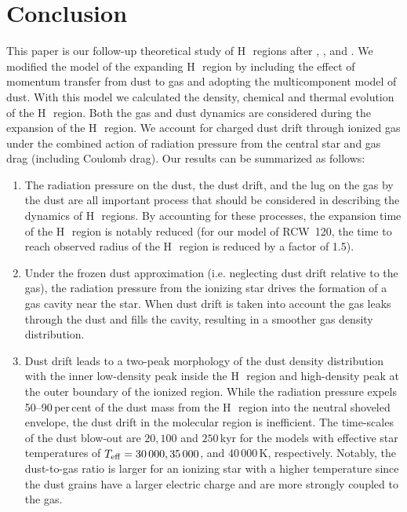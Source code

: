 \documentclass[a4paper,fleqn,usenatbib]{mnras}
\newcommand{\hii}    {H\,{\sc{ii}}~}
\begin{document}
\section{Conclusion}
This paper is our follow-up theoretical study of \hii regions after \cite{paper_hiimodel}, \cite{PavlyuchenkovAR}, and \cite{paper_mnrasi}. We modified the model of the expanding \hii region by including the effect of momentum transfer from dust to gas and adopting the multicomponent model of dust. With this model we calculated the density, chemical and thermal evolution of the \hii region. Both the gas and dust dynamics are considered during the expansion of the \hii region. We account for charged dust drift through ionized gas under the combined action of radiation pressure from the central star and gas drag (including Coulomb drag). Our results can be summarized as follows:
\begin{enumerate}
\item The radiation pressure on the dust, the dust drift, and the lug on the gas by the dust are all important process that should be considered in describing the dynamics of \hii regions. By accounting for these processes, the expansion time of the \hii region is notably reduced (for our model of RCW~120, the time to reach observed radius of the \hii region is reduced by a factor of 1.5).

\item Under the frozen dust approximation (i.e. neglecting dust drift relative to the gas), the radiation pressure from the ionizing star drives the formation of a gas cavity near the star. When dust drift is taken into account the gas leaks through the dust and fills the cavity, resulting in a smoother gas density distribution.

\item Dust drift leads to a two-peak morphology of the dust density distribution with the inner low-density peak inside the \hii region and high-density peak at the outer boundary of the ionized region. While the radiation pressure expels 50--90\,per\,cent of the dust mass from the \hii region into the neutral shoveled envelope, the dust drift in the molecular region is inefficient. The time-scales of the dust blow-out are $20, 100$ and $250$\,kyr for the models with effective star temperatures of $T_{\rm eff}=30\,000, 35\,000$, and $40\,000$\,K, respectively. Notably, the dust-to-gas ratio is larger for an ionizing star with a higher temperature since the dust grains have a larger electric charge and are more strongly coupled to the gas.
\end{enumerate}
\end{document}
